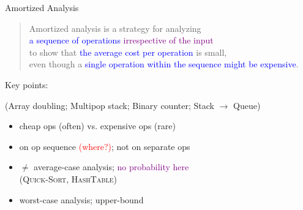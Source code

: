 \documentclass{beamer}
\begin{document}
\begin{frame}{Amortized Analysis}
  \begin{quote}
    Amortized analysis is a strategy for analyzing \\
    \textcolor{blue}{a sequence of operations} \textcolor{purple}{irrespective
    of the input} \\ to show that
    \textcolor{blue}{the average cost per operation} is small, \\
    even though a \textcolor{blue}{single operation within the sequence might be
    expensive}.
  \end{quote}

  \vspace{0.30cm}
  Key points:

  {\small (Array doubling; Multipop stack; Binary counter; Stack $\rightarrow$
  Queue)}
  \begin{itemize}
    \setlength{\itemsep}{3pt}
    \item cheap ops (often) vs. expensive ops (rare)
    \item on op sequence \textcolor{red}{(where?)}; not on separate ops
    \item $\neq$ average-case analysis; \textcolor{purple}{no probability
    here}\\
    (\textsc{Quick-Sort}, \textsc{HashTable})
    \item worst-case analysis; upper-bound
  \end{itemize}
\end{frame}
\end{document}
